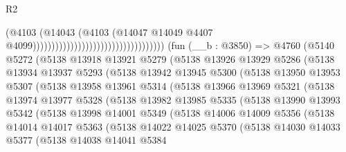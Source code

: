 \begin{lexlean}{R2}
\begin{coremodule}
                                                                  (@4103
                                                                    (@14043
                                                                      (@4103
                                                                        (@14047
                                                                          @14049
                                                                          @4407
                                                                          @4099)))))))))))))))))))))))))))))))))))
    (fun (__b : @3850) =>
    @4760
      (@5140
        @5272
        (@5138
          @13918
          @13921
          @5279
          (@5138
            @13926
            @13929
            @5286
            (@5138
              @13934
              @13937
              @5293
              (@5138
                @13942
                @13945
                @5300
                (@5138
                  @13950
                  @13953
                  @5307
                  (@5138
                    @13958
                    @13961
                    @5314
                    (@5138
                      @13966
                      @13969
                      @5321
                      (@5138
                        @13974
                        @13977
                        @5328
                        (@5138
                          @13982
                          @13985
                          @5335
                          (@5138
                            @13990
                            @13993
                            @5342
                            (@5138
                              @13998
                              @14001
                              @5349
                              (@5138
                                @14006
                                @14009
                                @5356
                                (@5138
                                  @14014
                                  @14017
                                  @5363
                                  (@5138
                                    @14022
                                    @14025
                                    @5370
                                    (@5138
                                      @14030
                                      @14033
                                      @5377
                                      (@5138
                                        @14038
                                        @14041
                                        @5384

\end{coremodule}
\end{lexlean}
